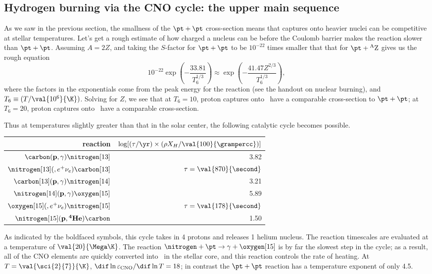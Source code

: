 \subsection[The CNO cycle]{Hydrogen burning via the CNO cycle: the upper main sequence}

As we saw in the previous section, the smallness of the $\pt+\pt$ cross-section means that captures onto heavier nuclei can be competitive at stellar temperatures.  Let's get a rough estimate of how charged a nucleus can be before the Coulomb barrier makes the reaction slower than $\pt+\pt$.  Assuming $A = 2Z$, and taking the $S$-factor for $\pt+\pt$ to be $10^{-22}$ times smaller that that for $\pt + \mathrm{^{A}Z}$ gives us the rough equation
\[ 10^{-22}\exp\left(-\frac{33.81}{T_{6}^{1/3}}\right) \approx \exp\left(-\frac{41.47 Z^{2/3}}{T_{6}^{1/3}}\right), \]
where the factors in the exponentials come from the peak energy for the reaction (see the handout on nuclear burning), and $T_{6}\equiv (T/\val{10^{6}}{\K})$.  Solving for $Z$, we see that at $T_{6} = 10$, proton captures onto \carbon\ have a comparable cross-section to $\pt + \pt$; at $T_{6} = 20$, proton captures onto \oxygen\ have a comparable cross-section.

Thus at temperatures slightly greater than that in the solar center, the following catalytic cycle becomes possible.
\begin{center}
\begin{tabular}{rr}
reaction & $\log[(\tau/\yr) \times (\rho X_{H}/\val{100}{\grampercc})]$\\
\hline
$\carbon(\mathbf{p},\gamma)\nitrogen[13]$ & 3.82\\
$\nitrogen[13](,e^{+}\nu_{e})\carbon[13]$ & $\tau=\val{870}{\second}$\\
$\carbon[13](\mathbf{p},\gamma)\nitrogen[14]$ & 3.21\\
$\nitrogen[14](\mathbf{p},\gamma)\oxygen[15]$ & 5.89 \\
$\oxygen[15](,e^{+}\nu_{e})\nitrogen[15]$ & $\tau = \val{178}{\second}$\\
$\nitrogen[15](\mathbf{p},\mathbf{^4He})\carbon$ & 1.50 \\
\hline
\end{tabular}
\end{center}
As indicated by the boldfaced symbols, this cycle takes in 4 protons and releases 1 helium nucleus.
The reaction timescales are evaluated at a temperature of $\val{20}{\Mega\K}$.
The reaction $\nitrogen+\pt\to\gamma+\oxygen[15]$ is by far the slowest step in the cycle; as a result, all of the CNO elements are quickly converted into \nitrogen\ in the stellar core, and this reaction controls the rate of heating.  At $T = \val{\sci{2}{7}}{\K}$, $\dif \ln \varepsilon_{\mathrm{CNO}}/\dif\ln T = 18$; in contrast the $\pt+\pt$ reaction has a temperature exponent of only 4.5.

